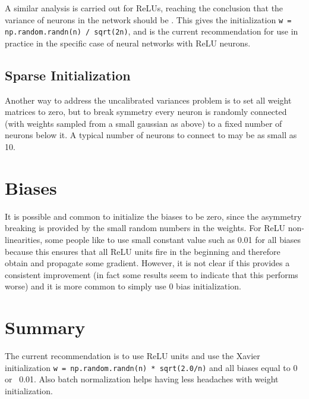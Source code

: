 A similar analysis is carried out for ReLUs, reaching the conclusion that the variance of neurons in the network should be . This gives the initialization \texttt{w = np.random.randn(n) / sqrt(2n)}, and is the current recommendation for use in practice in the specific case of neural networks with ReLU neurons.

\subsection*{Sparse Initialization}
Another way to address the uncalibrated variances problem is to set all weight matrices to zero, but to break symmetry every neuron is randomly connected (with weights sampled from a small gaussian as above) to a fixed number of neurons below it. A typical number of neurons to connect to may be as small as 10.

\section{Biases}
It is possible and common to initialize the biases to be zero, since the asymmetry breaking is provided by the small random numbers in the weights. For ReLU non-linearities, some people like to use small constant value such as 0.01 for all biases because this ensures that all ReLU units fire in the beginning and therefore obtain and propagate some gradient. However, it is not clear if this provides a consistent improvement (in fact some results seem to indicate that this performs worse) and it is more common to simply use 0 bias initialization.

\section*{Summary}
The current recommendation is to use ReLU units and use the Xavier initialization \texttt{w = np.random.randn(n) * sqrt(2.0/n)} and all biases equal to 0 or ~0.01. Also batch normalization helps having less headaches with weight initialization.